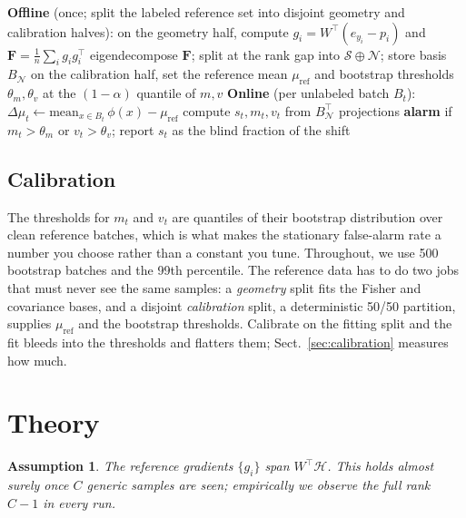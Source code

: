 \documentclass[acmsmall,screen]{acmart}
\theoremstyle{acmdefinition}
\newtheorem{assumption}{Assumption}
\newcommand{\F}{\mathbf{F}}
\newcommand{\act}{\phi}
\begin{document}
\begin{algorithm}[t]
\caption{FEATHER}
\label{alg:feather}
\begin{algorithmic}[1]
\Statex \textbf{Offline} (once; split the labeled reference set into disjoint
       geometry and calibration halves):
\State on the geometry half, compute $g_i = W^\top(e_{y_i} - p_i)$ and
       $\F = \frac{1}{n}\sum_i g_i g_i^\top$
\State eigendecompose $\F$; split at the rank gap into
       $\mathcal{S} \oplus \mathcal{N}$; store basis $B_\mathcal{N}$
\State on the calibration half, set the reference mean $\mu_{\mathrm{ref}}$ and
       bootstrap thresholds $\theta_m, \theta_v$ at the $(1-\alpha)$ quantile
       of $m, v$
\Statex \textbf{Online} (per unlabeled batch $B_t$):
\State $\Delta\mu_t \gets \mathrm{mean}_{x \in B_t}\,\act(x) - \mu_{\mathrm{ref}}$
\State compute $s_t, m_t, v_t$ from $B_\mathcal{N}^\top$ projections
\State \textbf{alarm} if $m_t > \theta_m$ or $v_t > \theta_v$;
       report $s_t$ as the blind fraction of the shift
\end{algorithmic}
\end{algorithm}

\subsection{Calibration}

The thresholds for $m_t$ and $v_t$ are quantiles of their bootstrap
distribution over clean reference batches, which is what makes the stationary
false-alarm rate a number you choose rather than a constant you tune.
Throughout, we use 500 bootstrap batches and the 99th percentile. The
reference data has to do two jobs that must never see the same samples: a
\emph{geometry} split fits the Fisher and covariance bases, and a disjoint
\emph{calibration} split, a deterministic 50/50 partition, supplies
$\mu_{\mathrm{ref}}$ and the bootstrap thresholds. Calibrate on the fitting
split and the fit bleeds into the thresholds and flatters them;
Sect.~\ref{sec:calibration} measures how much.

\section{Theory}
\label{sec:theory}

\begin{assumption}
\label{ass:span}
The reference gradients $\{g_i\}$ span $W^\top\!\mathcal{H}$. This holds
almost surely once $C$ generic samples are seen; empirically we observe the
full rank $C-1$ in every run.
\end{assumption}
\end{document}
